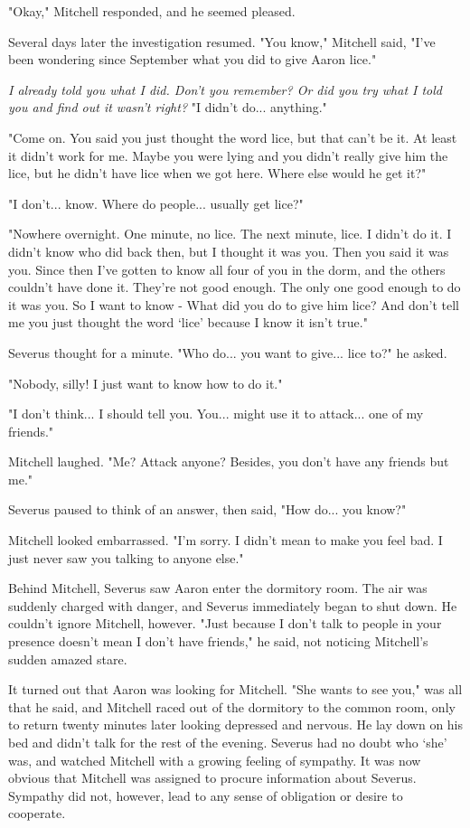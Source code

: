 \documentclass[a4paper,11pt]{article}
\begin{document}
"Okay," Mitchell responded, and he seemed pleased.

Several days later the investigation resumed. "You know," Mitchell said, "I've been wondering since September what you did to give Aaron lice."

\emph{I already told you what I did. Don't you remember? Or did you try what I told you and find out it wasn't right?} "I didn't do... anything."

"Come on. You said you just thought the word lice, but that can't be it. At least it didn't work for me. Maybe you were lying and you didn't really give him the lice, but he didn't have lice when we got here. Where else would he get it?"

"I don't... know. Where do people... usually get lice?"

"Nowhere overnight. One minute, no lice. The next minute, lice. I didn't do it. I didn't know who did back then, but I thought it was you. Then you said it was you. Since then I've gotten to know all four of you in the dorm, and the others couldn't have done it. They're not good enough. The only one good enough to do it was you. So I want to know - What did you do to give him lice? And don't tell me you just thought the word `lice' because I know it isn't true."

Severus thought for a minute. "Who do... you want to give... lice to?" he asked.

"Nobody, silly! I just want to know how to do it."

"I don't think... I should tell you. You... might use it to attack... one of my friends."

Mitchell laughed. "Me? Attack anyone? Besides, you don't have any friends but me."

Severus paused to think of an answer, then said, "How do... you know?"

Mitchell looked embarrassed. "I'm sorry. I didn't mean to make you feel bad. I just never saw you talking to anyone else."

Behind Mitchell, Severus saw Aaron enter the dormitory room. The air was suddenly charged with danger, and Severus immediately began to shut down. He couldn't ignore Mitchell, however. "Just because I don't talk to people in your presence doesn't mean I don't have friends," he said, not noticing Mitchell's sudden amazed stare.

It turned out that Aaron was looking for Mitchell. "She wants to see you," was all that he said, and Mitchell raced out of the dormitory to the common room, only to return twenty minutes later looking depressed and nervous. He lay down on his bed and didn't talk for the rest of the evening. Severus had no doubt who `she' was, and watched Mitchell with a growing feeling of sympathy. It was now obvious that Mitchell was assigned to procure information about Severus. Sympathy did not, however, lead to any sense of obligation or desire to cooperate.
\end{document}
